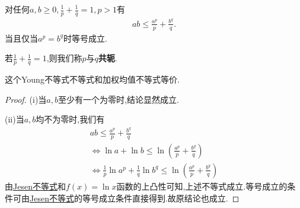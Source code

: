 \documentclass[../../main.tex]{subfiles}
\begin{document}
\begin{theorem}[Young不等式]\label{theorem:Young不等式}
对任何$a,b\geqslant 0,\frac{1}{p}+\frac{1}{q}=1,p>1$有
\begin{align*}
ab\leqslant \frac{a^p}{p}+\frac{b^q}{q}.
\end{align*}
当且仅当$a^p=b^q$时等号成立.
\end{theorem}
\begin{note}
若$\frac{1}{p}+\frac{1}{q}=1$,则我们称$p$与$q$\textbf{共轭}.\label{实数之间的共轭}
\end{note}
\begin{remark}
这个Young不等式不等式和加权均值不等式等价.
\end{remark}
\begin{proof}
(i)当$a,b$至少有一个为零时,结论显然成立.

(ii)当$a,b$均不为零时,我们有
\begin{gather*}
ab\leqslant \frac{a^p}{p}+\frac{b^q}{q}
\\
\Leftrightarrow \ln a+\ln b\leqslant \ln \left( \frac{a^p}{p}+\frac{b^q}{q} \right) 
\\
\Leftrightarrow \frac{1}{p}\ln a^p+\frac{1}{q}\ln b^q\leqslant \ln \left( \frac{a^p}{p}+\frac{b^q}{q} \right) 
\end{gather*}
由\hyperref[theorem:Jesen不等式]{Jesen不等式}和$f\left( x \right) =\ln x$函数的上凸性可知,上述不等式成立.等号成立的条件可由\hyperref[theorem:Jesen不等式]{Jesen不等式}的等号成立条件直接得到.故原结论也成立.   
\end{proof}
\end{document}

